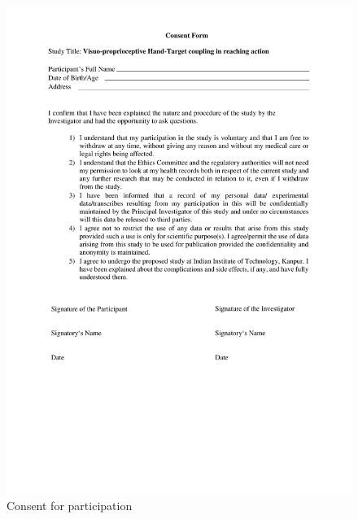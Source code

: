 \begin{figure}[h!]
\centering       
    \includegraphics[width=\textwidth, keepaspectratio]{Images/admin/Consent Form- PPS Experiment-1.png}
    \caption{Consent for participation}
    \label{}
\end{figure}